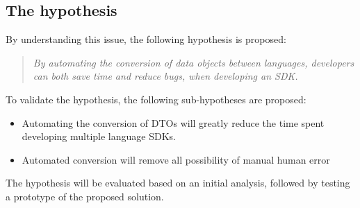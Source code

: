 \subsection{The hypothesis}
By understanding this issue, the following hypothesis is proposed:
\begin{quote} 
\centering 
\textit{By automating the conversion of data objects between languages, developers can both save time and reduce bugs, when developing an SDK.}
\end{quote}
To validate the hypothesis, the following sub-hypotheses are proposed:
\begin{itemize}
    \item Automating the conversion of DTOs will greatly reduce the time spent developing multiple language SDKs.
    \item Automated conversion will remove all possibility of manual human error
\end{itemize}
The hypothesis will be evaluated based on an initial analysis, followed by testing a prototype of the proposed solution.
